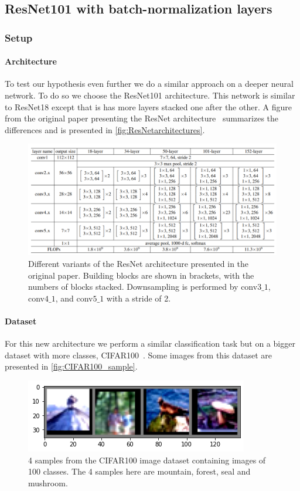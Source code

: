 \documentclass[a4paper,11pt,oneside]{report}
\begin{document}
\subsection{ResNet101 with batch-normalization layers}
\subsubsection{Setup}
\paragraph{Architecture}
To test our hypothesis even further we do a similar approach on a deeper neural network. To do so we choose the ResNet101 architecture. This network is similar to ResNet18 except that is has more layers stacked one after the other. A figure from the original paper presenting the ResNet architecture~\citep{he2015deep} summarizes the differences and is presented in \autoref{fig:ResNetarchitectures}.

\begin{figure}
    \centering
    \includegraphics{figures/ResNetArchitectures.png}
    \caption{Different variants of the ResNet architecture presented in the original paper. Building blocks are shown in brackets, with the numbers of blocks stacked. Downsampling is performed by conv$3\_1$, conv$4\_1$, and conv$5\_1$ with a stride of 2.}
    \label{fig:ResNetarchitectures}
\end{figure}

\paragraph{Dataset}
For this new architecture we perform a similar classification task but on a bigger dataset with more classes, CIFAR100~\citep{Krizhevsky09learningmultiple}. Some images from this dataset are presented in \autoref{fig:CIFAR100_sample}.

\begin{figure}
    \centering
    \includegraphics{figures/CIFAR100_sample.png}
    \caption{4 samples from the CIFAR100 image dataset containing images of 100 classes. The 4 samples here are mountain, forest, seal and mushroom.}
    \label{fig:CIFAR100_sample}
\end{figure}
\end{document}
